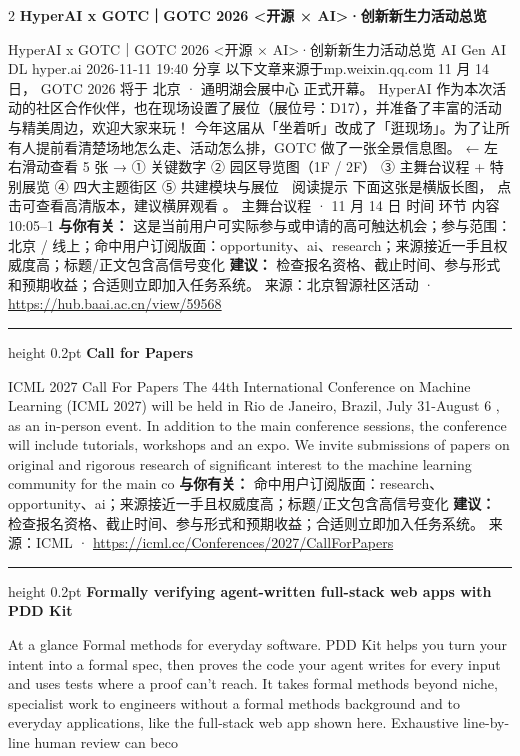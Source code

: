 \documentclass[10.5pt]{ctexart}
\begin{document}
\begin{multicols}{2}
{\large\bfseries HyperAI x GOTC｜GOTC 2026 <开源 × AI>·创新新生力活动总览}\par
HyperAI x GOTC｜GOTC 2026 <开源 × AI>·创新新生力活动总览 AI Gen AI DL hyper.ai 2026-11-11 19:40 分享 以下文章来源于mp.weixin.qq.com 11 月 14 日， GOTC 2026 将于 北京 · 通明湖会展中心 正式开幕。 HyperAI 作为本次活动的社区合作伙伴，也在现场设置了展位（展位号：D17），并准备了丰富的活动与精美周边，欢迎大家来玩！ 今年这届从「坐着听」改成了「逛现场」。为了让所有人提前看清楚场地怎么走、活动怎么排，GOTC 做了一张全景信息图。 ← 左右滑动查看 5 张 → ① 关键数字 ② 园区导览图（1F / 2F） ③ 主舞台议程 + 特别展览 ④ 四大主题街区 ⑤ 共建模块与展位 📱 阅读提示 下面这张是横版长图， 点击可查看高清版本，建议横屏观看 。 主舞台议程 · 11 月 14 日 时间 环节 内容 10:05–1
\textbf{与你有关：} 这是当前用户可实际参与或申请的高可触达机会；参与范围：北京 / 线上；命中用户订阅版面：opportunity、ai、research；来源接近一手且权威度高；标题/正文包含高信号变化
\textbf{建议：} 检查报名资格、截止时间、参与形式和预期收益；合适则立即加入任务系统。
{\footnotesize\color{ormuted} 来源：北京智源社区活动 · \url{https://hub.baai.ac.cn/view/59568}}
\vspace{2mm}
\hrule height 0.2pt
\vspace{2mm}
{\large\bfseries Call for Papers}\par
ICML 2027 Call For Papers The 44th International Conference on Machine Learning (ICML 2027) will be held in Rio de Janeiro, Brazil, July 31-August 6 , as an in-person event. In addition to the main conference sessions, the conference will include tutorials, workshops and an expo. We invite submissions of papers on original and rigorous research of significant interest to the machine learning community for the main co
\textbf{与你有关：} 命中用户订阅版面：research、opportunity、ai；来源接近一手且权威度高；标题/正文包含高信号变化
\textbf{建议：} 检查报名资格、截止时间、参与形式和预期收益；合适则立即加入任务系统。
{\footnotesize\color{ormuted} 来源：ICML · \url{https://icml.cc/Conferences/2027/CallForPapers}}
\vspace{2mm}
\hrule height 0.2pt
\vspace{2mm}
{\large\bfseries Formally verifying agent-written full-stack web apps with PDD Kit}\par
At a glance Formal methods for everyday software. PDD Kit helps you turn your intent into a formal spec, then proves the code your agent writes for every input and uses tests where a proof can’t reach. It takes formal methods beyond niche, specialist work to engineers without a formal methods background and to everyday applications, like the full-stack web app shown here. Exhaustive line-by-line human review can beco

\end{multicols}
\end{document}
